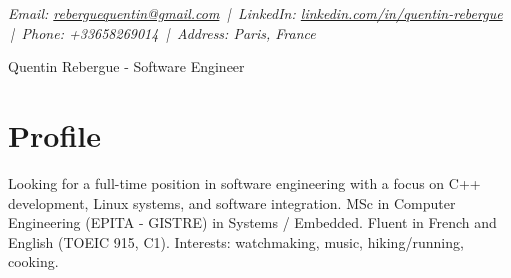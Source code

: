 \documentclass[9pt,a4paper]{article}
\newcommand{\namefont}{\fontsize{18}{22}\selectfont}
\newcommand{\tinyscript}{\fontsize{8}{8}\selectfont}
\begin{document}
\renewcommand\normalsize{\fontsize{10.5}{15}\selectfont}
\normalsize

\begin{center}
  {\tinyscript\itshape
  Email: \href{mailto:reberguequentin@gmail.com}{reberguequentin@gmail.com} \,|\,
  LinkedIn: \href{https://linkedin.com/in/quentin-rebergue}{linkedin.com/in/quentin-rebergue} \,|\,
  Phone: +33658269014 \,|\,
  Address: Paris, France}
\end{center}

\begin{center}
  {\namefont Quentin Rebergue - Software Engineer}
\end{center}

\section*{Profile}
\begin{tcolorbox}[mybox2]
Looking for a full-time position in software engineering with a focus on C++ development, Linux systems, and software integration. MSc in Computer Engineering (EPITA - GISTRE) in Systems / Embedded. Fluent in French and English (TOEIC 915, C1). Interests: watchmaking, music, hiking/running, cooking.
\end{tcolorbox}
\end{document}
